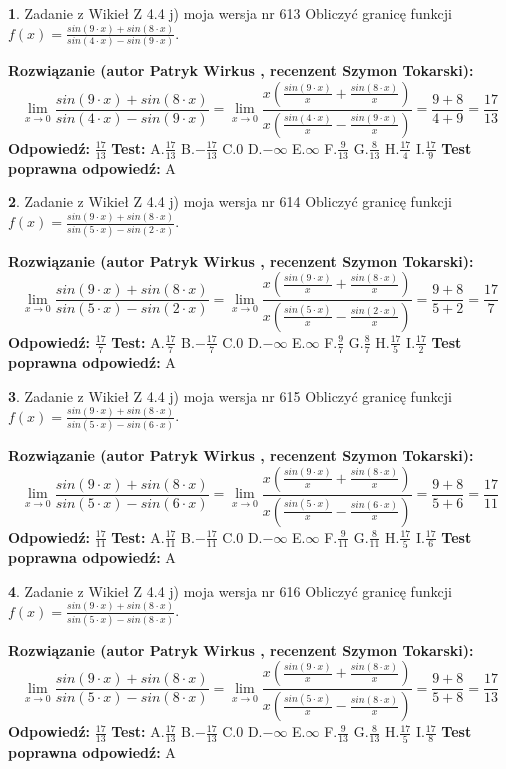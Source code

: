 \documentclass[12pt, a4paper]{article}
\theoremstyle{definition} %
\newtheorem{zad}{}
\newcommand{\zadStart}[1]{\begin{zad}#1\newline}
\newcommand{\zadStop}{\end{zad}}
\newcommand{\rozwStart}[2]{\noindent \textbf{Rozwiązanie (autor #1 , recenzent #2): }\newline}
\newcommand{\rozwStop}{\newline}
\newcommand{\odpStart}{\noindent \textbf{Odpowiedź:}\newline}
\newcommand{\odpStop}{\newline}
\newcommand{\testStart}{\noindent \textbf{Test:}\newline}
\newcommand{\testStop}{\newline}
\newcommand{\kluczStart}{\noindent \textbf{Test poprawna odpowiedź:}\newline}
\newcommand{\kluczStop}{\newline}
\begin{document}
\zadStart{Zadanie z Wikieł Z 4.4 j) moja wersja nr 613}
Obliczyć granicę funkcji $f(x)=\frac{sin(9\cdot x) +sin(8\cdot x)}{sin(4\cdot x) -sin(9\cdot x)}$.
\zadStop
\rozwStart{Patryk Wirkus}{Szymon Tokarski}
$$\lim\limits_{x\to 0}\frac{sin(9\cdot x) +sin(8\cdot x)}{sin(4\cdot x) -sin(9\cdot x)}=\lim\limits_{x\to 0}\frac{x(\frac{sin(9\cdot x)}{x}+\frac{sin(8\cdot x)}{x})}{x(\frac{sin(4\cdot x)}{x}-\frac{sin(9\cdot x)}{x})}=\frac{9+8}{4+9} = \frac{17}{13}$$
\rozwStop
\odpStart
$\frac{17}{13}$
\odpStop
\testStart
A.$\frac{17}{13}$
B.$-\frac{17}{13}$
C.$0$
D.$-\infty$
E.$\infty$
F.$\frac{9}{13}$
G.$\frac{8}{13}$
H.$\frac{17}{4}$
I.$\frac{17}{9}$
\testStop
\kluczStart
A
\kluczStop



\zadStart{Zadanie z Wikieł Z 4.4 j) moja wersja nr 614}
Obliczyć granicę funkcji $f(x)=\frac{sin(9\cdot x) +sin(8\cdot x)}{sin(5\cdot x) -sin(2\cdot x)}$.
\zadStop
\rozwStart{Patryk Wirkus}{Szymon Tokarski}
$$\lim\limits_{x\to 0}\frac{sin(9\cdot x) +sin(8\cdot x)}{sin(5\cdot x) -sin(2\cdot x)}=\lim\limits_{x\to 0}\frac{x(\frac{sin(9\cdot x)}{x}+\frac{sin(8\cdot x)}{x})}{x(\frac{sin(5\cdot x)}{x}-\frac{sin(2\cdot x)}{x})}=\frac{9+8}{5+2} = \frac{17}{7}$$
\rozwStop
\odpStart
$\frac{17}{7}$
\odpStop
\testStart
A.$\frac{17}{7}$
B.$-\frac{17}{7}$
C.$0$
D.$-\infty$
E.$\infty$
F.$\frac{9}{7}$
G.$\frac{8}{7}$
H.$\frac{17}{5}$
I.$\frac{17}{2}$
\testStop
\kluczStart
A
\kluczStop



\zadStart{Zadanie z Wikieł Z 4.4 j) moja wersja nr 615}
Obliczyć granicę funkcji $f(x)=\frac{sin(9\cdot x) +sin(8\cdot x)}{sin(5\cdot x) -sin(6\cdot x)}$.
\zadStop
\rozwStart{Patryk Wirkus}{Szymon Tokarski}
$$\lim\limits_{x\to 0}\frac{sin(9\cdot x) +sin(8\cdot x)}{sin(5\cdot x) -sin(6\cdot x)}=\lim\limits_{x\to 0}\frac{x(\frac{sin(9\cdot x)}{x}+\frac{sin(8\cdot x)}{x})}{x(\frac{sin(5\cdot x)}{x}-\frac{sin(6\cdot x)}{x})}=\frac{9+8}{5+6} = \frac{17}{11}$$
\rozwStop
\odpStart
$\frac{17}{11}$
\odpStop
\testStart
A.$\frac{17}{11}$
B.$-\frac{17}{11}$
C.$0$
D.$-\infty$
E.$\infty$
F.$\frac{9}{11}$
G.$\frac{8}{11}$
H.$\frac{17}{5}$
I.$\frac{17}{6}$
\testStop
\kluczStart
A
\kluczStop



\zadStart{Zadanie z Wikieł Z 4.4 j) moja wersja nr 616}
Obliczyć granicę funkcji $f(x)=\frac{sin(9\cdot x) +sin(8\cdot x)}{sin(5\cdot x) -sin(8\cdot x)}$.
\zadStop
\rozwStart{Patryk Wirkus}{Szymon Tokarski}
$$\lim\limits_{x\to 0}\frac{sin(9\cdot x) +sin(8\cdot x)}{sin(5\cdot x) -sin(8\cdot x)}=\lim\limits_{x\to 0}\frac{x(\frac{sin(9\cdot x)}{x}+\frac{sin(8\cdot x)}{x})}{x(\frac{sin(5\cdot x)}{x}-\frac{sin(8\cdot x)}{x})}=\frac{9+8}{5+8} = \frac{17}{13}$$
\rozwStop
\odpStart
$\frac{17}{13}$
\odpStop
\testStart
A.$\frac{17}{13}$
B.$-\frac{17}{13}$
C.$0$
D.$-\infty$
E.$\infty$
F.$\frac{9}{13}$
G.$\frac{8}{13}$
H.$\frac{17}{5}$
I.$\frac{17}{8}$
\testStop
\kluczStart
A
\kluczStop
\end{document}
